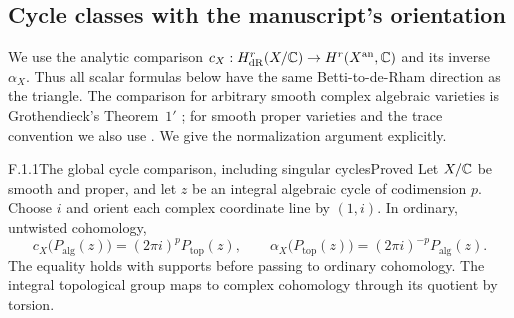 \subsection{Cycle classes with the manuscript's orientation}

We use the analytic comparison $c_X:H^r_{\mathrm{dR}}(X/\mathbb C)\to H^r(X^{\mathrm{an}},\mathbb C)$ and its inverse $\alpha_X$. Thus all scalar formulas below have the same Betti-to-de-Rham direction as the triangle. The comparison for arbitrary smooth complex algebraic varieties is Grothendieck's Theorem~$1'$ \cite{Grothendieck1966}; for smooth proper varieties and the trace convention we also use \cite[Theorem 1.4 and the cycle/trace paragraphs of \S1, pp.9--11 in the revised version]{Deligne1982Cycles}. We give the normalization argument explicitly.

\begin{result}{F.1.1}{The global cycle comparison, including singular cycles}{Proved}
Let $X/\mathbb C$ be smooth and proper, and let $z$ be an integral algebraic cycle of codimension $p$. Choose $i$ and orient each complex coordinate line by $(1,i)$. In ordinary, untwisted cohomology,
\[
 c_X\bigl(P_{\mathrm{alg}}(z)\bigr)=(2\pi i)^pP_{\mathrm{top}}(z),
 \qquad
 \alpha_X\bigl(P_{\mathrm{top}}(z)\bigr)=(2\pi i)^{-p}P_{\mathrm{alg}}(z).
 \tag{F.1.1}
\]
The equality holds with supports before passing to ordinary cohomology. The integral topological group maps to complex cohomology through its quotient by torsion.
\end{result}
